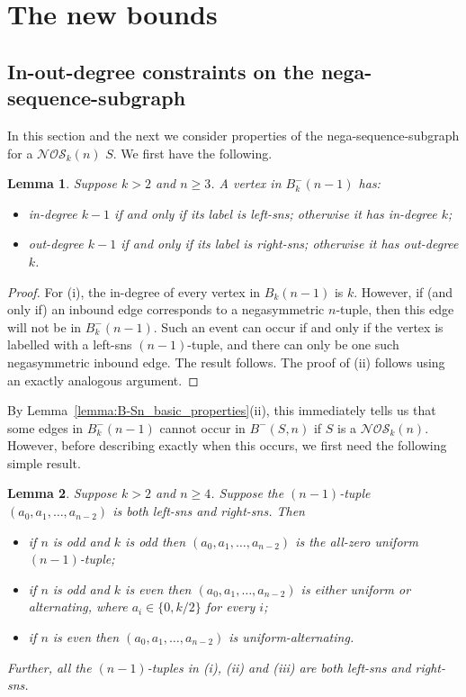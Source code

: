 \documentclass[a4paper,11pt]{article}
\theoremstyle{plain}
\newtheorem{lemma}{Lemma}[section]
\theoremstyle{definition}
\theoremstyle{remark}
\begin{document}
\section{The new bounds}  \label{section:bounds}


\subsection{In-out-degree constraints on the nega-sequence-subgraph}
\label{subsection:NOS_in-out-constraints}

In this section and the next we consider properties of the nega-sequence-subgraph for a
$\mathcal{NOS}_k(n)$ $S$.  We first have the following.

\begin{lemma}  \label{lemma:B-_vertex_degree_k-1}
Suppose $k>2$ and $n\geq3$.  A vertex in $B^-_k(n-1)$ has:
\begin{itemize}
\item[i)] in-degree $k-1$ if and only if its label is left-sns; otherwise it has in-degree $k$;
\item[ii)] out-degree $k-1$ if and only if its label is right-sns; otherwise it has out-degree
    $k$.
\end{itemize}
\end{lemma}

\begin{proof}
For (i), the in-degree of every vertex in $B_k(n-1)$ is $k$.  However, if (and only if) an inbound
edge corresponds to a negasymmetric $n$-tuple, then this edge will not be in $B_k^-(n-1)$.  Such an
event can occur if and only if the vertex is labelled with a left-sns $(n-1)$-tuple, and there can
only be one such negasymmetric inbound edge.  The result follows.  The proof of (ii) follows using
an exactly analogous argument.
\end{proof}

By Lemma~\ref{lemma:B-Sn_basic_properties}(ii), this immediately tells us that some edges in
$B^-_k(n-1)$ cannot occur in $B^-(S,n)$ if $S$ is a $\mathcal{NOS}_k(n)$.  However, before
describing exactly when this occurs, we first need the following simple result.

\begin{lemma}  \label{lemma:combining_lns-rns-symmetric}
Suppose $k>2$ and $n\geq4$.  Suppose the $(n-1)$-tuple $(a_0,a_1,\ldots,a_{n-2})$ is both
left-sns and right-sns.  Then

\begin{itemize}
\item[i)] if $n$ is odd and $k$ is odd then $(a_0,a_1,\ldots,a_{n-2})$ is the all-zero uniform
    $(n-1)$-tuple;
\item[ii)] if $n$ is odd and $k$ is even then $(a_0,a_1,\ldots,a_{n-2})$ is either uniform or
    alternating, where $a_i\in\{0,k/2\}$ for every $i$;
\item[iii)] if $n$ is even then $(a_0,a_1,\ldots,a_{n-2})$ is uniform-alternating.
\end{itemize}
Further, all the $(n-1)$-tuples in (i), (ii) and (iii) are both left-sns and right-sns.
\end{lemma}
\end{document}

